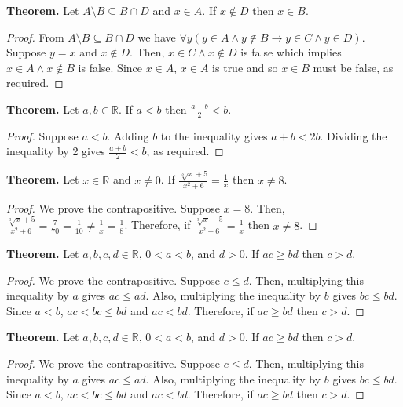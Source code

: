 \documentclass[12pt,letterpaper]{exam}
\newenvironment{theorem}
{\textbf{Theorem.}}{\par}
\begin{document}
\begin{questions}
    \question
    \begin{theorem}
        Let $A \setminus B \subseteq B \cap D$ and $x \in A$. If $x \not\in D$ then $x \in B$.
    \end{theorem}
    \begin{proof}
        From $A \setminus B \subseteq B \cap D$ we have
        $\forall y(y \in A \land y \not\in B \rightarrow y \in C \land y \in D)$.
        Suppose $y = x$ and $x \not\in D$. 
        Then, $x \in C \land x \not\in D$ is false which implies $x \in A \land x \not\in B$ is false.
        Since $x \in A$, $x \in A$ is true and so $x \in B$ must be false, as required.
    \end{proof}

    \question
    \begin{theorem}
        Let $a, b \in \mathbb{R}$. If $a < b$ then $\frac{a+b}{2} < b$.
    \end{theorem}
    \begin{proof}
        Suppose $a < b$. 
        Adding $b$ to the inequality gives $a + b < 2b$. 
        Dividing the inequality by 2 gives $\frac{a+b}{2} < b$, as required.
    \end{proof}

    \question
    \begin{theorem}
        Let $x \in \mathbb{R}$ and $x \neq 0$. If $\frac{\sqrt[3]{x}+5}{x^2+6} = \frac{1}{x}$ then $x \neq 8$.
    \end{theorem}
    \begin{proof}
        We prove the contrapositive. 
        Suppose $x = 8$. 
        Then, $\frac{\sqrt[3]{x}+5}{x^2+6} = \frac{7}{70} = \frac{1}{10} \neq \frac{1}{x} = \frac{1}{8}$.
        Therefore, if $\frac{\sqrt[3]{x}+5}{x^2+6} = \frac{1}{x}$ then $x \neq 8$.
    \end{proof}

    \question
    \begin{theorem}
        Let $a, b, c, d \in \mathbb{R}$, $0 < a < b$, and $d > 0$. If $ac \geq bd$ then $c > d$.
    \end{theorem}
    \begin{proof}
        We prove the contrapositive.
        Suppose $c \leq d$. Then, multiplying this inequality by $a$ gives $ac \leq ad$.
        Also, multiplying the inequality by $b$ gives $bc \leq bd$. 
        Since $a < b$, $ac < bc \leq bd$ and $ac < bd$.
        Therefore, if $ac \geq bd$ then $c > d$.
    \end{proof}

    \question
    \begin{theorem}
        Let $a, b, c, d \in \mathbb{R}$, $0 < a < b$, and $d > 0$. If $ac \geq bd$ then $c > d$.
    \end{theorem}
    \begin{proof}
        We prove the contrapositive.
        Suppose $c \leq d$. Then, multiplying this inequality by $a$ gives $ac \leq ad$.
        Also, multiplying the inequality by $b$ gives $bc \leq bd$. 
        Since $a < b$, $ac < bc \leq bd$ and $ac < bd$.
        Therefore, if $ac \geq bd$ then $c > d$.
    \end{proof}
\end{questions}
\end{document}
